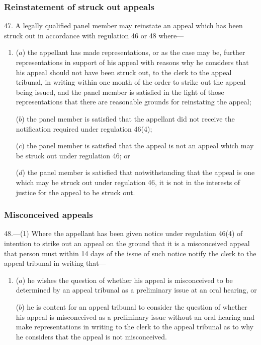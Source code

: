 \documentclass[12pt,a4paper]{article}
\begin{document}
\subsubsection[47. Reinstatement of struck out appeals]{Reinstatement of struck out appeals}

47.  A legally qualified panel member may reinstate an appeal which has been struck out in accordance with regulation 46 
or 48  %
where—
\begin{enumerate}\item[]
($a$) the appellant has made representations, or as the case may be, further representations in support of his appeal with reasons why he considers that his appeal should not have been struck out, to the clerk to the appeal tribunal, in writing within one month of the order to strike out the appeal being issued, and the panel member is satisfied in the light of those representations that there are reasonable grounds for reinstating the appeal;

($b$) the panel member is satisfied that the appellant did not receive the notification required under regulation 46(4);

($c$) the panel member is satisfied that the appeal is not an appeal which may be struck out under regulation 46; or

($d$) the panel member is satisfied that notwithstanding that the appeal is one which may be struck out under regulation 46, it is not in the interests of justice for the appeal to be struck out.
\end{enumerate}


\subsubsection[48. Misconceived appeals]{Misconceived appeals}

48.—(1) Where the appellant has been given notice under regulation 46(4) of intention to strike out an appeal on the ground that it is a misconceived appeal that person must within 14 days of the issue of such notice notify the clerk to the appeal tribunal in writing that—
\begin{enumerate}\item[]
($a$) he wishes the question of whether his appeal is misconceived to be determined by an appeal tribunal as a preliminary issue at an oral hearing, or

($b$) he is content for an appeal tribunal to consider the question of whether his appeal is misconceived as a preliminary issue without an oral hearing and make representations in writing to the clerk to the appeal tribunal as to why he considers that the appeal is not misconceived.
\end{enumerate}
\end{document}
